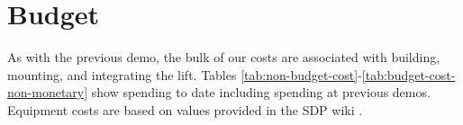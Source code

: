\documentclass{article}
\begin{document}
\section{Budget}
\label{budget}
As with the previous demo, the bulk of our costs are associated with building, mounting, and integrating the lift. Tables \ref{tab:non-budget-cost}-\ref{tab:budget-cost-non-monetary} show spending to date including spending at previous demos. Equipment costs are based on values provided in the SDP wiki \cite{sdpcosts}.

\begin{table}[h]
  \begin{center}
    \begin{small}
      \begin{sc}

\end{sc}
\end{small}
\caption{Non-budgeted monetary costs at demo \demoNumber. Note that we have chosen to stop using the EV3 and instead use the Arduino kit.}
\label{tab:non-budget-cost}
\end{center}
\end{table}
\end{document}
